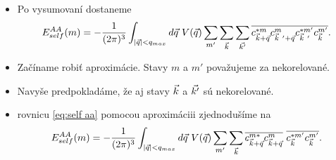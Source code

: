 \documentclass[
	11pt, %
]{beamer}
\begin{document}
\begin{frame}
\begin{itemize}
\item Po vysumovaní dostaneme
\begin{align}
\label{eq:self aa}
E_{self}^{AA}(m)= - \frac{1}{(2\pi)^3}\int_{|\vq| < q_{max}} d\vq\ V(\vq) \sum_{m'}\sum_{\vk}\sum_{\vkp}\overline{c^{*m}_{\vk+\vq}c^{m}_{\vk\ '+\vq}c^{*m'}_{\vk\ '}c^{m'}_{\vk}}\text{.}
\end{align}
\item Začíname robiť aproximácie. Stavy $m$ a $m'$ považujeme za nekorelované. 
\item Navyše predpokladáme, že aj stavy $\vec{k}$ a $\vec{k'}$ sú nekorelované.
\item rovnicu \eqref{eq:self aa} pomocou aproximáciii zjednodušíme na
\begin{align}
\label{eq:05energy2}
E_{self}^{AA}(m)= - \frac{1}{(2\pi)^3} \int_{|\vq| < q_{max}} d\vq\ V(\vq) \sum_{m'}\sum_{\vk} \overline{c^{m*}_{\vk+\vq}c^{m}_{\vk+\vq}}\ \overline{c^{*m'}_{\vk}c^{m'}_{\vk}} \text{.}
\end{align}
\end{itemize}
\end{frame}
\end{document}
